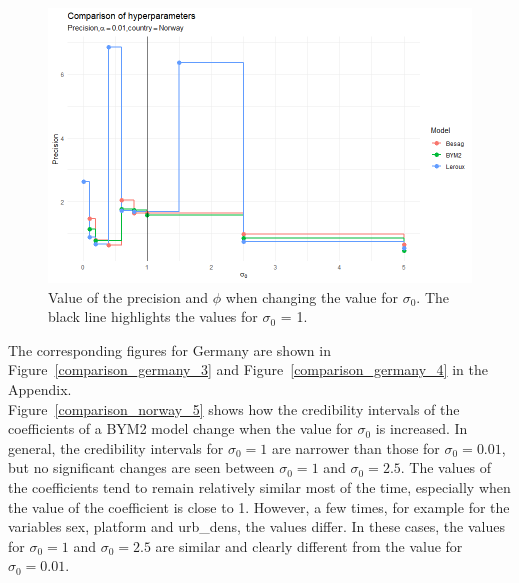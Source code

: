 %     
\begin{figure}[H]
    \centering
    \includegraphics[width = \textwidth]{hyper_comp_norway_2.png}
    \caption{Value of the precision and $\phi$ when changing the value for $\sigma_0$. The black line highlights the values for $\sigma_0$ = 1.}
    \label{comparison_norway_4}
\end{figure}
%     
The corresponding figures for Germany are shown in Figure~\ref{comparison_germany_3} and Figure~\ref{comparison_germany_4} in the Appendix. \\
Figure~\ref{comparison_norway_5} shows how the credibility intervals of the coefficients of a BYM2 model change when the value for $\sigma_0$ is increased. In general, the credibility intervals for $\sigma_0 = 1$ are narrower than those for $\sigma_0 = 0.01$, but no significant changes are seen between $\sigma_0 = 1$ and $\sigma_0 = 2.5$. The values of the coefficients tend to remain relatively similar most of the time, especially when the value of the coefficient is close to 1. However, a few times, for example for the variables sex, platform and urb\_dens, the values differ. In these cases, the values for $\sigma_0 = 1$ and $\sigma_0 = 2.5$ are similar and clearly different from the value for $\sigma_0 = 0.01$.
